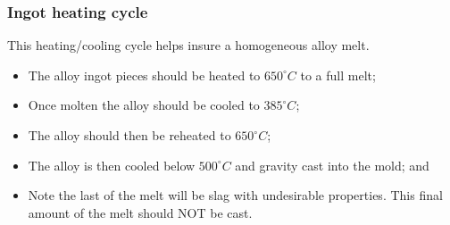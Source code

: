 \subsubsection{Ingot heating cycle}

This heating/cooling cycle helps insure a homogeneous alloy melt.
\begin{itemize}
\item The \MgZnCa alloy ingot pieces should be heated to $650^{\circ}C$ to a full melt;
\item Once molten the alloy should be cooled to $385^{\circ}C$;
\item The alloy should then be reheated to $650^{\circ}C$;
\item The alloy is then cooled below $500^{\circ}C$ and gravity cast into the mold; and
\item Note the last of the melt will be slag with undesirable properties. This final amount of the melt should NOT be cast.
\end{itemize}